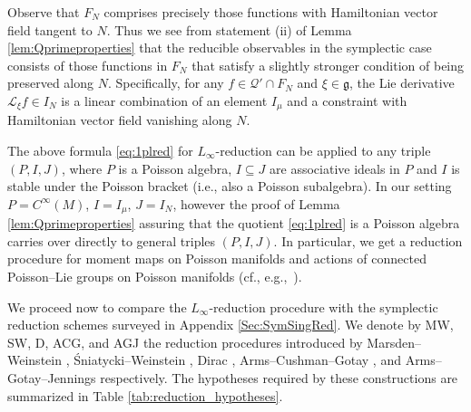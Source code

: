 \documentclass[10pt,a4paper]{amsart}
\numberwithin{equation}{section}
\newcommand{\g}{\mathfrak{g}}
\renewcommand{\L}{\mathscr{L}}
\renewcommand{\subset}{\subseteq}
\begin{document}
\begin{Remark}
	Observe that $F_N$ comprises precisely those functions with Hamiltonian vector field tangent to $N$.
	Thus we see from statement (ii) of Lemma \ref{lem:Qprimeproperties} that the reducible observables in the symplectic case consists of those functions in $F_N$ that satisfy a slightly stronger condition of being preserved along $N$. Specifically, for any $f \in\mathcal{Q}'\cap F_N$ and $\xi \in \g$, the Lie derivative $\L_\xi f \in I_N$ is a linear combination of an element $I_\mu$ and a constraint with Hamiltonian vector field vanishing along $N$.
\end{Remark}


\begin{Remark} The above formula \eqref{eq:1plred} for $L_\infty$-reduction can be applied to any triple $(P,I,J)$, where $P$ is a Poisson algebra, $I\subset J$ are associative ideals in $P$ and $I$ is stable under the Poisson bracket (i.e., also a Poisson subalgebra).  In our setting $P=C^{\infty}(M)$, $I=I_\mu$, $J=I_N$, however the proof of Lemma \ref{lem:Qprimeproperties} assuring that the quotient \eqref{eq:1plred} is a Poisson algebra carries over directly to general triples $(P,I,J)$. In particular, we get a reduction procedure for moment maps on Poisson manifolds and actions of connected Poisson--Lie groups on Poisson manifolds (cf., e.g.,~\cite{Esposito2014}).
\end{Remark}

We proceed now to compare the $L_\infty$-reduction procedure with the symplectic reduction schemes surveyed in Appendix \ref{Sec:SymSingRed}.
We denote by MW, SW, D, ACG, and AGJ the reduction procedures introduced by Marsden--Weinstein \cite{MarsdenWeinstein74},  \'Sniatycki--Weinstein \cite{SniatyckiWeinstein83}, Dirac \cite{Dirac64}, Arms--Cushman--Gotay \cite{ArmsCushmanGotay91}, and Arms--Gotay--Jennings \cite{ArmsGotayJennings90} respectively.
The hypotheses required by these constructions are summarized in Table \ref{tab:reduction_hypotheses}.
\end{document}
